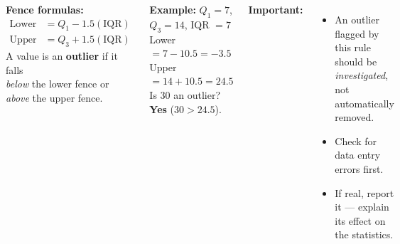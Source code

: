 \documentclass[aspectratio=169, 11pt]{beamer}
\begin{document}
{
\begin{frame}[t, plain]
  \vspace{1em}%
  \hspace{0.55cm}%
  \begin{minipage}{0.9\textwidth}
    \small
    \begin{columns}[t]
        \textbf{\color{navy}Fence formulas:}
        \begin{align*}
          \text{Lower fence} &= Q_1 - 1.5(\text{IQR})\\
          \text{Upper fence} &= Q_3 + 1.5(\text{IQR})
        \end{align*}
        A value is an \textbf{outlier} if it falls\\
        \textit{below} the lower fence or\\
        \textit{above} the upper fence.

        \vspace{0.3cm}
        \textbf{\color{navy}Example:} $Q_1 = 7$, $Q_3 = 14$, IQR $= 7$\\
        Lower $= 7 - 10.5 = -3.5$\\
        Upper $= 14 + 10.5 = 24.5$\\
        Is 30 an outlier? \textbf{Yes} ($30 > 24.5$).

        \textbf{\color{navy}Important:}
        \begin{itemize}\setlength{\itemsep}{0.5em}
          \item An outlier flagged by this rule should be \textit{investigated}, not automatically removed.
          \item Check for data entry errors first.
          \item If real, report it --- explain its effect on the statistics.
        \end{itemize}
    \end{columns}
  \end{minipage}
\end{frame}
}
\end{document}
